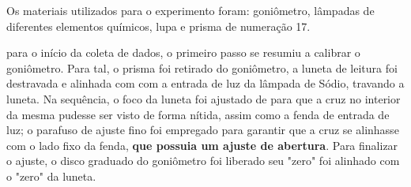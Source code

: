 Os materiais utilizados para o experimento foram: goniômetro, lâmpadas de diferentes elementos químicos, lupa e prisma de numeração 17.

para  o início da coleta de dados, o primeiro passo se resumiu a calibrar o goniômetro. Para tal, o prisma foi retirado do goniômetro, a luneta de leitura foi destravada e alinhada com com a entrada de luz da lâmpada de Sódio, travando a luneta. Na sequência, o foco da luneta foi ajustado de para que a cruz no interior da mesma pudesse ser visto de forma nítida, assim como a fenda de entrada de luz; o parafuso de ajuste fino foi empregado para garantir que a cruz se alinhasse com o lado fixo da fenda, \textbf{que possuia um ajuste de abertura}. Para finalizar o ajuste, o disco graduado do goniômetro foi liberado seu "zero" foi alinhado com o "zero" da luneta.

